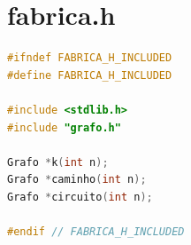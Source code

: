 \documentclass[12pt,a4paper,oneside]{article}
\begin{document}
\newpage

\section{fabrica.h}

\begin{lstlisting}[language=C]
#ifndef FABRICA_H_INCLUDED
#define FABRICA_H_INCLUDED

#include <stdlib.h>
#include "grafo.h"

Grafo *k(int n);
Grafo *caminho(int n);
Grafo *circuito(int n);

#endif // FABRICA_H_INCLUDED\end{lstlisting}
\end{document}
